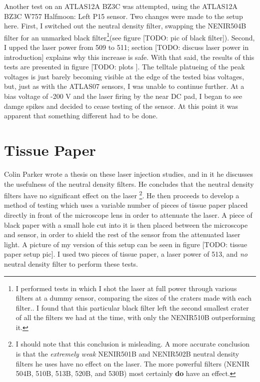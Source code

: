 \documentclass{report}
\begin{document}
            Another test on an ATLAS12A BZ3C was attempted, using the ATLAS12A BZ3C W757 Halfmoon: Left P15 sensor. Two changes were made to the setup here. First, I switched out the neutral density filter, swapping the NENIR504B filter for an unmarked black filter\footnote{I performed tests in which I shot the laser at full power through various filters at a dummy sensor, comparing the sizes of the craters made with each filter.. I found that this particular black filter left the second smallest crater of all the filters we had at the time, with only the NENIR510B outperforming it.}(see figure [TODO: pic of black filter]). Second, I upped the laser power from 509 to 511; section [TODO: discuss laser power in introduction] explains why this increase is safe. With that said, the results of this tests are presented in figure [TODO: plots
            ]. The telltale platueing of the peak voltages is just barely becoming visible at the edge of the tested bias voltages, but, just as with the ATLAS07 sensors, I was unable to continue further. At a bias voltage of -200 V and the laser firing by the near DC pad, I began to see damge spikes and decided to cease testing of the sensor. At this point it was apparent that something different had to be done.
            

        \section{Tissue Paper}
            Colin Parker wrote a thesis on these laser injection studies, and in it he discusses the usefulness of the neutral density filters. He concludes that the neutral density filters have no significant effect on the laser \footnote{I should note that this conclusion is misleading. A more accurate conclusion is that the \textit{extremely weak} NENIR501B and NENIR502B neutral density filters he uses have no effect on the laser. The more powerful filters (NENIR 504B, 510B, 513B, 520B, and 530B) most certainly \textbf{do} have an effect.}. He then proceeds to develop a method of testing which uses a variable number of pieces of tissue paper placed directly in front of the microscope lens in order to attenuate the laser. A piece of black paper with a small hole cut into it is then placed between the microscope and sensor, in order to shield the rest of the sensor from the attenuated laser light. A picture of my version of this setup can be seen in figure [TODO: tissue paper setup pic]. I used two pieces of tissue paper, a laser power of 513, and \textit{no} neutral density filter to perform these tests.
\end{document}
